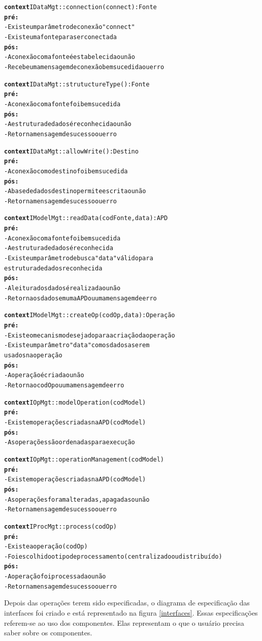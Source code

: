 \begin{alltt}
	
	\textbf{context} IDataMgt :: connection(connect):Fonte
		\textbf{pré:}
		- Existe um parâmetro de conexão "connect"
		- Existe uma fonte para ser conectada
		\textbf{pós:}
		- A conexão com a fonte é estabelecida ou não
		- Recebe uma mensagem de conexão bem sucedida ou erro

	\textbf{context} IDataMgt :: strutuctureType():Fonte
		\textbf{pré:}
		- A conexão com a fonte foi bem sucedida
		\textbf{pós:}
		- A estrutura de dados é reconhecida ou não
		- Retorna mensagem de sucesso ou erro
		
	\textbf{context} IDataMgt :: allowWrite():Destino
		\textbf{pré:}
		- A conexão com o destino foi bem sucedida
		\textbf{pós:}
		- A base de dados destino permite escrita ou não
		- Retorna mensagem de sucesso ou erro
	
	\textbf{context} IModelMgt :: readData(codFonte, data):APD
		\textbf{pré:}
		- A conexão com a fonte foi bem sucedida
		- A estrutura de dados é reconhecida
		- Existe um parâmetro de busca "data" válido para 
		estrutura de dados reconhecida
		\textbf{pós:}
		- A leitura dos dados é realizada ou não
		- Retorna os dados em uma APD ou uma mensagem de erro
		
	\textbf{context} IModelMgt :: createOp(codOp, data):Operação
		\textbf{pré:}
		- Existe o mecanismo desejado para a criação da operação
		- Existe um parâmetro "data" com os dados a serem 
		usados na operação
		\textbf{pós:}
		- A operação é criada ou não
		- Retorna o codOp ou uma mensagem de erro
		
	\textbf{context} IOpMgt :: modelOperation(codModel)
		\textbf{pré:}
		- Existem operações criadas na APD (codModel)
		\textbf{pós:}
		- As operações são ordenadas para execução
		
	\textbf{context} IOpMgt :: operationManagement(codModel)
		\textbf{pré:}
		- Existem operações criadas na APD (codModel)
		\textbf{pós:}
		- As operações foram alteradas, apagadas ou não
		- Retorna mensagem de sucesso ou erro
	
	\textbf{context} IProcMgt :: process(codOp)
		\textbf{pré:}
		- Existe a operação (codOp)
		- Foi escolhido o tipo de processamento (centralizado ou distribuído)
		\textbf{pós:}
		- A operação foi processada ou não
		- Retorna mensagem de sucesso ou erro
		
			
\end{alltt}

Depois das operações terem sido especificadas, o diagrama de especificação das interfaces foi criado e está representado na figura \ref{interfaces}. Essas especificações referem-se ao uso dos componentes. Elas representam o que o usuário precisa saber sobre os componentes.

